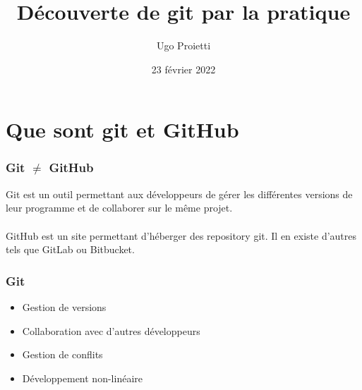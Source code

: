 \documentclass{beamer}
\title[Github]{Découverte de git par la pratique} %
\author{Ugo Proietti} %
\institute[UMONS] %
{
Université de Mons \\
CPUMons \\ %
\medskip
\textit{ugo.proietti@student.umons.ac.be} %
}
\date{23 février 2022} %
\begin{document}
\begin{frame}
\titlepage %
\end{frame}

\begin{frame}
\frametitle{} %
\tableofcontents %
\end{frame}


\section{Que sont git et GitHub} %

\begin{frame}\frametitle{Git $\neq$ GitHub}
Git est un outil permettant aux développeurs de gérer les différentes versions de leur programme et de collaborer sur le même projet.\\~\\

GitHub est un site permettant d'héberger des repository git. Il en existe d'autres tels que GitLab ou Bitbucket.
\end{frame}


\begin{frame}\frametitle{Git}
\begin{itemize}
    \item Gestion de versions
    \item Collaboration avec d'autres développeurs
    \item Gestion de conflits
    \item Développement non-linéaire
\end{itemize}
\end{frame}
\end{document}
